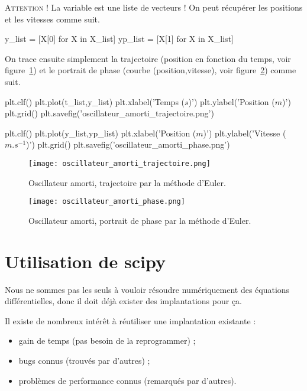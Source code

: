 \textsc{Attention !} La variable  est une liste de vecteurs ! On peut récupérer les positions et les vitesses comme suit. 

\begin{pyverbatim}
y_list = [X[0] for X in X_list]
yp_list = [X[1] for X in X_list]
\end{pyverbatim}

On trace ensuite simplement la trajectoire (position en fonction du temps, voir figure~\ref{11:fig:oscillateur_amorti_trajectoire}) et le portrait de phase (courbe (position,vitesse), voir figure~\ref{11:fig:oscillateur_amorti_phase}) comme suit. 
\begin{pyverbatim}
plt.clf()
plt.plot(t_list,y_list)
plt.xlabel('Temps ($s$)')
plt.ylabel('Position ($m$)')
plt.grid()
plt.savefig('oscillateur_amorti_trajectoire.png')

plt.clf()
plt.plot(y_list,yp_list)
plt.xlabel('Position ($m$)')
plt.ylabel('Vitesse ($m.s^{-1}$)')
plt.grid()
plt.savefig('oscillateur_amorti_phase.png')
\end{pyverbatim}
\begin{figure}[!h]
    \begin{center}
        \texttt{[image: oscillateur\_amorti\_trajectoire.png]}
        \caption{Oscillateur amorti, trajectoire par la méthode d'Euler.}
        \label{11:fig:oscillateur_amorti_trajectoire}
    \end{center}
\end{figure}
\begin{figure}[!h]
    \begin{center}
        \texttt{[image: oscillateur\_amorti\_phase.png]}
        \caption{Oscillateur amorti, portrait de phase par la méthode d'Euler.}
        \label{11:fig:oscillateur_amorti_phase}
    \end{center}
\end{figure}

\section{Utilisation de scipy}

Nous ne sommes pas les seuls à vouloir résoudre numériquement des
équations différentielles, donc il doit déjà exister des implantations
pour ça.

Il existe de nombreux intérêt à réutiliser une implantation existante :
\begin{itemize}
\item gain de temps (pas besoin de la reprogrammer) ;
\item bugs connus (trouvés par d'autres) ;
\item problèmes de performance connus (remarqués par d'autres).
\end{itemize}

